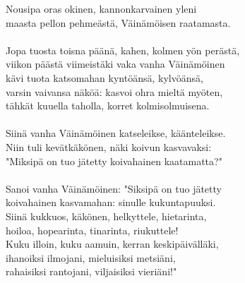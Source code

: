Nousipa oras okinen, kannonkarvainen yleni                      \\
maasta pellon pehmeästä, Väinämöisen raatamasta.                \\
                                                                \\
Jopa tuosta toisna päänä, kahen, kolmen yön perästä,            \\
viikon päästä viimeistäki vaka vanha Väinämöinen                \\
kävi tuota katsomahan kyntöänsä, kylvöänsä,                     \\
varsin vaivansa näköä: kasvoi ohra mieltä myöten,               \\
tähkät kuuella taholla, korret kolmisolmuisena.                 \\
                                                                \\
Siinä vanha Väinämöinen katseleikse, käänteleikse.              \\
Niin tuli kevätkäkönen, näki koivun kasvavaksi:                 \\
"Miksipä on tuo jätetty koivahainen kaatamatta?"                \\
                                                                \\
Sanoi vanha Väinämöinen: "Siksipä on tuo jätetty                \\
koivahainen kasvamahan: sinulle kukuntapuuksi.                  \\
Siinä kukkuos, käkönen, helkyttele, hietarinta,                 \\
hoiloa, hopearinta, tinarinta, riukuttele!                      \\
Kuku illoin, kuku aamuin, kerran keskipäivälläki,               \\
ihanoiksi ilmojani, mieluisiksi metsiäni,                       \\
rahaisiksi rantojani, viljaisiksi vieriäni!"                    \\